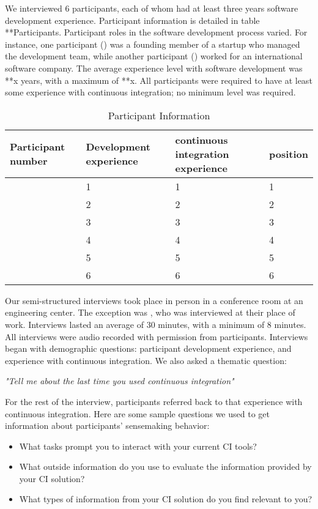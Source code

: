 \documentclass{sig-alternate-05-2015}
\begin{document}
We interviewed 6 participants, each of whom had at least three years software development experience. Participant information is detailed in table **Participants. Participant roles in the software development process varied. For instance, one participant (\cpg) was a founding member of a startup who managed the development team, while another participant (\david) worked for an international software company. The average experience level with software development was **x years, with a maximum of **x. All participants were required to have at least some experience with continuous integration; no minimum level was required.
\begin{table}
\centering
\caption{Participant Information}
\begin{tabular}{ | p{} | p{} | p{} | p{} | }\hline
	Participant number & Development experience & continuous integration experience & position \\ \hline
	\michael & 1 & 1 & 1 \\ \hline
	\sruti & 2 & 2 & 2 \\ \hline
	\caius & 3 & 3 & 3 \\ \hline
	\srutitwo & 4 & 4 & 4 \\ \hline
	\david & 5 & 5 & 5 \\ \hline
	\cpg & 6 & 6 & 6 \\ \hline
\end{tabular}
\end{table}
Our semi-structured interviews took place in person in a conference room at an engineering center. The exception was \cpg, who was interviewed at their place of work. Interviews lasted an average of 30 minutes, with a minimum of 8 minutes. All interviews were audio recorded with permission from participants.  Interviews began with demographic questions: participant development experience, and experience with continuous integration. We also asked a thematic question:

\smallskip
\textit{"Tell me about the last time you used continuous integration"}


For the rest of the interview, participants referred back to that experience with continuous integration. Here are some sample questions we used to get information about participants' sensemaking behavior:
\begin{itemize}  
	\item What tasks prompt you to interact with your current CI tools?
	\item What outside information do you use to evaluate the information provided by your CI solution?
	\item What types of information from your CI solution do you find relevant to you? 
\end{itemize}
\end{document}
